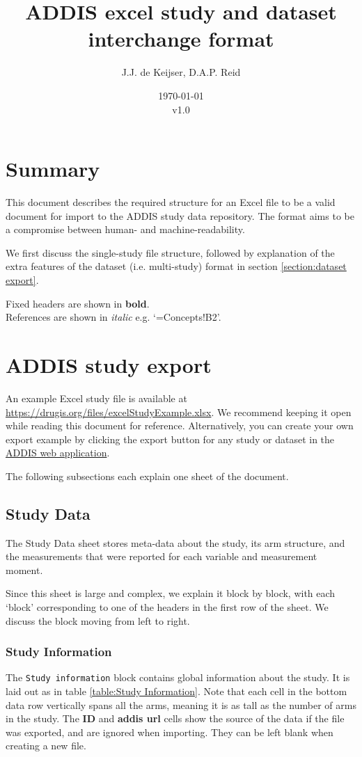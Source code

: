 \documentclass[a4paper,10pt]{article}
\title{ADDIS excel study and dataset interchange format}
\author{J.J. de Keijser, D.A.P. Reid}
\date{\today\\v1.0}
\begin{document}
\maketitle
\section{Summary}

This document describes the required structure for an Excel file to be a valid document for import to the ADDIS study data repository. The format aims to be a compromise between human- and machine-readability.

We first discuss the single-study file structure, followed by explanation of the extra features of the dataset (i.e. multi-study) format in section \ref{section:dataset export}.

Fixed headers are shown in \textbf{bold}.\\
References are shown in \textit{italic} e.g. `=Concepts!B2'.\\

\section{ADDIS study export}
An example Excel study file is available at \url{https://drugis.org/files/excelStudyExample.xlsx}. We recommend keeping it open while reading this document for reference. Alternatively, you can create your own export example by clicking the export button for any study or dataset in the \href{https://addis.drugis.org/}{ADDIS web application}.


The following subsections each explain one sheet of the document.

\subsection{Study Data}
The Study Data sheet stores meta-data about the study, its arm structure, and the measurements that were reported for each variable and measurement moment.

Since this sheet is large and complex, we explain it block by block, with each `block' corresponding to one of the headers in the first row of the sheet. We discuss the block moving from left to right.

\subsubsection{Study Information}
The \texttt{Study information} block contains global information about the study. It is laid out as in table \ref{table:Study Information}. Note that each cell in the bottom data row vertically spans all the arms, meaning it is as tall as the number of arms in the study. The \textbf{ID} and \textbf{addis url} cells show the source of the data if the file was exported, and are ignored when importing. They can be left blank when creating a new file.
\end{document}

